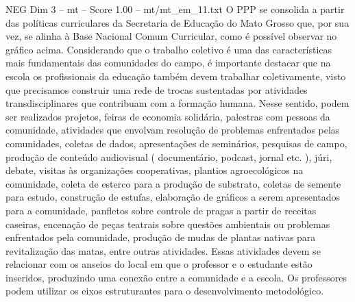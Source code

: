 \begin{textsample}{NEG Dim 3 – mt – Score 1.00 – mt/mt\_em\_11.txt}
O PPP se consolida a partir das políticas curriculares da Secretaria de Educação do Mato Grosso que, por sua vez, se alinha à Base Nacional Comum Curricular, como é possível observar no gráfico acima.
Considerando que o trabalho coletivo é uma das características mais fundamentais das comunidades do campo, é importante destacar que na escola os profissionais da educação também devem trabalhar coletivamente, visto que precisamos construir uma rede de trocas sustentadas por atividades transdisciplinares que contribuam com a formação humana.
Nesse sentido, podem ser realizados projetos, feiras de economia solidária, palestras com pessoas da comunidade, atividades que envolvam resolução de problemas enfrentados pelas comunidades, coletas de dados, apresentações de seminários, pesquisas de campo, produção de conteúdo audiovisual ( documentário, podcast, jornal etc. ), júri, debate, visitas às organizações cooperativas, plantios agroecológicos na comunidade, coleta de esterco para a produção de substrato, coletas de semente para estudo, construção de estufas, elaboração de gráficos a serem apresentados para a comunidade, panfletos sobre controle de pragas a partir de receitas caseiras, encenação de peças teatrais sobre questões ambientais ou problemas enfrentados pela comunidade, produção de mudas de plantas nativas para revitalização das matas, entre outras atividades.
Essas atividades devem se relacionar com os anseios do local em que o professor e o estudante estão inseridos, produzindo uma conexão entre a comunidade e a escola.
Os professores podem utilizar os eixos estruturantes para o desenvolvimento metodológico.

\end{textsample}
